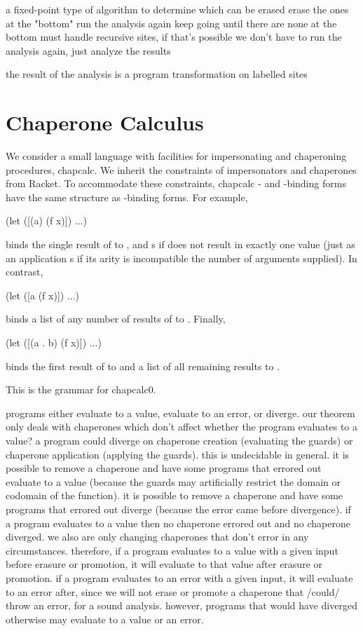 \documentclass{sigplanconf}
\begin{document}
a fixed-point type of algorithm to determine which can be erased
erase the ones at the "bottom"
run the analysis again
keep going until there are none at the bottom
must handle recursive sites, if that's possible
we don't have to run the analysis again, just analyze the results

the result of the analysis is a program transformation on labelled sites

\section{Chaperone Calculus}

We consider a small language with facilities for impersonating and chaperoning procedures, chapcalc.
We inherit the constraints of impersonators and chaperones from Racket.
To accommodate these constraints, chapcalc - and -binding forms have the same structure as -binding forms.
For example,
\begin{schemedisplay}
(let ([(a) (f x)])
  ...)
\end{schemedisplay}
binds the single result of  to , and s if  does not result in exactly one value (just as an application s if its arity is incompatible the number of arguments supplied).
In contrast,
\begin{schemedisplay}
(let ([a (f x)])
  ...)
\end{schemedisplay}
binds a list of any number of results of  to .
Finally,
\begin{schemedisplay}
(let ([(a . b) (f x)])
  ...)
\end{schemedisplay}
binds the first result of  to  and a list of all remaining results to .

This is the grammar for chapcalc0.
\begin{figure*}

\end{figure*}

programs either evaluate to a value, evaluate to an error, or diverge.
our theorem only deals with chaperones which don't affect whether the program evaluates to a value?
a program could diverge on chaperone creation (evaluating the guards) or chaperone application (applying the guards).
this is undecidable in general.
it is possible to remove a chaperone and have some programs that errored out evaluate to a value (because the guards may artificially restrict the domain or codomain of the function).
it is possible to remove a chaperone and have some programs that errored out diverge (because the error came before divergence).
if a program evaluates to a value then no chaperone errored out and no chaperone diverged.
we also are only changing chaperones that don't error in any circumstances.
therefore, if a program evaluates to a value with a given input before erasure or promotion, it will evaluate to that value after erasure or promotion.
if a program evaluates to an error with a given input, it will evaluate to an error after, since we will not erase or promote a chaperone that /could/ throw an error, for a sound analysis.
however, programs that would have diverged otherwise may evaluate to a value or an error.
\end{document}
